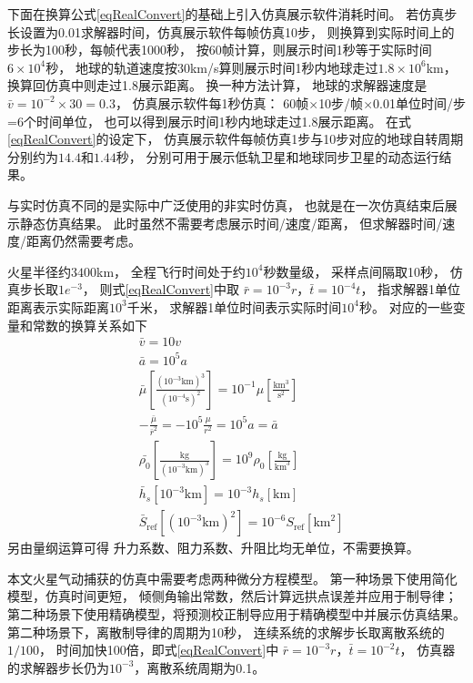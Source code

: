 下面在换算公式\eqref{eqRealConvert}的基础上引入仿真展示软件消耗时间。
若仿真步长设置为0.01求解器时间，仿真展示软件每帧仿真10步，
则换算到实际时间上的步长为100秒，每帧代表1000秒，
按60帧计算，则展示时间1秒等于实际时间$6\times10^4$秒，
地球的轨道速度按30km/s算则展示时间1秒内地球走过$1.8\times10^6$km，
换算回仿真中则走过1.8展示距离。
换一种方法计算，
地球的求解器速度是$\bar{v}=10^{-2}\times30=0.3$，
仿真展示软件每1秒仿真：
60帧$\times$10步/帧$\times$0.01单位时间/步=6个时间单位，
也可以得到展示时间1秒内地球走过1.8展示距离。
在式\eqref{eqRealConvert}的设定下，
仿真展示软件每帧仿真1步与10步对应的地球自转周期分别约为$14.4$和$1.44$秒，
分别可用于展示低轨卫星和地球同步卫星的动态运行结果。

与实时仿真不同的是实际中广泛使用的非实时仿真，
也就是在一次仿真结束后展示静态仿真结果。
此时虽然不需要考虑展示时间/速度/距离，
但求解器时间/速度/距离仍然需要考虑。

火星半径约$3400$km，
全程飞行时间处于约$10^4$秒数量级，
采样点间隔取10秒，
仿真步长取$1e^{-3}$，
则式\eqref{eqRealConvert}中取
$\bar{r}=10^{-3}r$，$\bar{t}=10^{-4}t$，
指求解器1单位距离表示实际距离$10^3$千米，
求解器1单位时间表示实际时间$10^4$秒。
对应的一些变量和常数的换算关系如下
\begin{align*}
    &\bar{v} = 10v \\
    &\bar{a} = 10^5a \\
    &\bar{\mu}\left[\frac{(10^{-3}\text{km})^3}{(10^{-4}\text{s})^2}\right]
     = 10^{-1}\mu\left[\frac{\text{km}^3}{\text{s}^2}\right] \\
    &-\frac{\bar{\mu}}{\bar{r}^2} = -10^5\frac{\mu}{r^2} = 10^5a = \bar{a} \\
    &\bar{\rho_0}\left[\frac{\text{kg}}{(10^{-3}\text{km})^3}\right]
    = 10^9\rho_0\left[\frac{\text{kg}}{\text{km}^3}\right] \\
    &\bar{h}_s[10^{-3}\text{km}] = 10^{-3}h_s[\text{km}] \\
    &\bar{S}_\text{ref}[(10^{-3}\text{km})^2] = 10^{-6}S_\text{ref}[\text{km}^2]
\end{align*}
另由量纲运算可得
升力系数、阻力系数、升阻比均无单位，不需要换算。

本文火星气动捕获的仿真中需要考虑两种微分方程模型。
第一种场景下使用简化模型，仿真时间更短，
倾侧角输出常数，然后计算远拱点误差并应用于制导律；
第二种场景下使用精确模型，将预测校正制导应用于精确模型中并展示仿真结果。
第二种场景下，离散制导律的周期为10秒，
连续系统的求解步长取离散系统的$1/100$，
时间加快100倍，即式\eqref{eqRealConvert}中
$\bar{r}=10^{-3}r$，$\bar{t}=10^{-2}t$，
仿真器的求解器步长仍为$10^{-3}$，离散系统周期为0.1。

